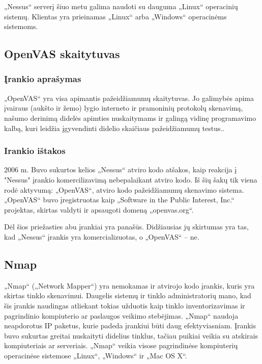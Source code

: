 \documentclass[a4paper,12pt,fleqn]{article}
\begin{document}
„Nessus“ serverį šiuo metu galima naudoti su dauguma „Linux“ operacinių sistemų. Klientas yra prieinamas „Linux“ arba „Windows“ operacinėms sistemoms. 



\subsection{OpenVAS skaitytuvas}
\label{sec:example}

\subsubsection{Įrankio aprašymas}

„OpenVAS“ yra visa apimantis pažeidžiamumų skaitytuvas. Jo galimybės apima įvairaus (aukšto ir žemo) lygio interneto ir pramoninių protokolų skenavimą, našumo derinimą didelės apimties nuskaitymams ir galingą vidinę programavimo kalbą, kuri leidžia įgyvendinti didelio skaičiaus pažeidžiamumų testus.\cite{inproceedings}.

\subsubsection{Irankio ištakos}


2006 m. Buvo sukurtos kelios „Nessus“ atviro kodo atšakos, kaip reakcija į "Nessus" įrankio komercilizavimą nebepalaikant atviro kodo. Iš šių šakų tik viena rodė aktyvumą: „OpenVAS“, atviro kodo pažeidžiamumų skenavimo sistema. „OpenVAS“ buvo įregistruotas kaip „Software in the Public Interest, Inc.“ projektas, skirtas valdyti ir apsaugoti domeną „openvas.org“.

Dėl šios priežasties abu įrankiai yra panašūs. Didžiausias jų skirtumas yra tas, kad „Nessus“ įrankis yra komercializuotas, o „OpenVAS“ – ne.


\subsection{Nmap}
\label{sec:nmap}

„Nmap“ („Network Mapper“) yra nemokamas ir atvirojo kodo įrankis, kuris yra skirtas tinklo skenavimui. Daugelis sistemų ir tinklo administratorių mano, kad šis įrankis naudingas atliekant tokias užduotis kaip tinklo inventorizavimas ir  pagrindinio kompiuterio ar paslaugos veikimo stebėjimas. „Nmap“ naudoja neapdorotus IP paketus, kurie padeda įrankiui būti daug efektyviasniam. Įrankis buvo sukurtas greitai nuskaityti didelius tinklus, tačiau puikiai veikia su atskirais kompiuteriais ar serveriais. „Nmap“ veikia visose pagrindinėse kompiuterių operacinėse sistemose  „Linux“, „Windows“ ir „Mac OS X“\cite{Orebaugh:2008:NEY:1571843}. 
\end{document}
